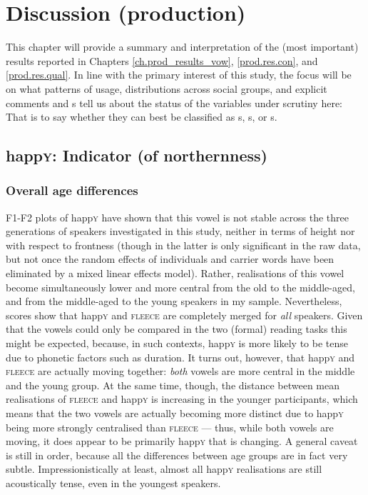 \chapter{Discussion (production)}
\label{ch.prod_discussion}

This chapter will provide a summary and interpretation of the (most important) results reported in Chapters \ref{ch.prod_results_vow}, \ref{prod.res.con}, and \ref{prod.res.qual}.
In line with the primary interest of this study, the focus will be on what patterns of usage, distributions across social groups, and explicit comments and s tell us about the status of the variables under scrutiny here: That is to say whether they can best be classified as s, s, or s.

\section{happ\textsc{y}: Indicator (of northernness)}
\label{prod.disc.happy}

\subsection{Overall age differences}
\label{prod.disc.happy.age}

F1-F2 plots of happ\textsc{y} have shown that this vowel is not stable across the three generations of speakers investigated in this study, neither in terms of height nor with respect to frontness (though  in the latter is only significant in the raw data, but not once the random effects of individuals and carrier words have been eliminated by a mixed linear effects model).
Rather, realisations of this vowel become simultaneously lower and more central from the old to the middle-aged, and from the middle-aged to the young speakers in my sample.
Nevertheless,  scores show that happ\textsc{y} and \textsc{fleece} are completely merged for \emph{all} speakers.
Given that the vowels could only be compared in the two (formal) reading tasks this might be expected, because, in such contexts, happ\textsc{y} is more likely to be tense due to phonetic factors such as duration.
It turns out, however, that happ\textsc{y} and \textsc{fleece} are actually moving together: \emph{both} vowels are more central in the middle and the young group.
At the same time, though, the distance between mean realisations of \textsc{fleece} and happ\textsc{y} is increasing in the younger participants, which means that the two vowels are actually becoming more distinct due to happ\textsc{y} being more strongly centralised than \textsc{fleece} --- thus, while both vowels are moving, it does appear to be primarily happ\textsc{y} that is changing.
A general caveat is still in order, because all the differences between age groups are in fact very subtle.
Impressionistically at least, almost all happ\textsc{y} realisations are still acoustically tense, even in the youngest speakers.


